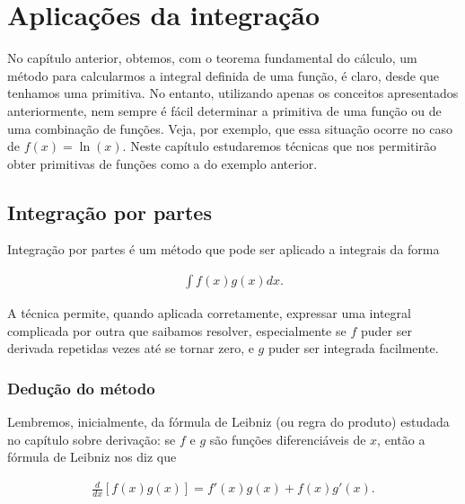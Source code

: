 
\chapter{Aplicações da integração}\label{cap:apl_integracao}

	No capítulo anterior, obtemos, com o teorema fundamental do cálculo, um método para calcularmos a integral definida de uma função, é claro, desde que tenhamos uma primitiva. No entanto, utilizando apenas os conceitos apresentados anteriormente, nem sempre é fácil determinar a primitiva de uma função ou de uma combinação de funções. Veja, por exemplo, que essa situação ocorre no caso de $f(x)= \ln(x)$. Neste capítulo estudaremos técnicas que nos permitirão obter primitivas de funções como a do exemplo anterior.

\section{Integração por partes}
	Integração por partes é um método que pode ser aplicado a integrais da forma
	
	\[\begin{split}
		\int f(x)g(x)dx.
	\end{split}\]
	
	A técnica permite, quando aplicada corretamente, expressar uma integral complicada por outra que saibamos resolver, %
	especialmente se $f$ puder ser derivada repetidas vezes até se tornar zero, e $g$ puder ser integrada facilmente.
	
\subsection*{Dedução do método}
	Lembremos, inicialmente, da fórmula de Leibniz (ou regra do produto) estudada no capítulo sobre derivação: se $f$ e $g$ são funções diferenciáveis de $x$, então a fórmula de Leibniz nos diz que 
	
	\[\begin{split}
		\frac{d}{dx}[f(x)g(x)] = f'(x)g(x) + f(x)g'(x).
	\end{split}\]
	
